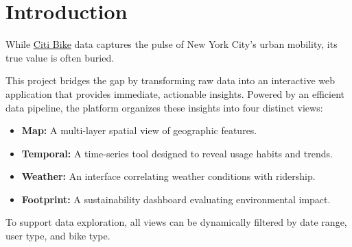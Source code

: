 \section{Introduction}\label{sec:introduction}
While \href{https://www.citibikenyc.com/system-data}{\underline{Citi Bike}} data captures the pulse of New York City's urban mobility, its true value is often buried.

This project bridges the gap by transforming raw data into an interactive web application that provides immediate, actionable insights.
Powered by an efficient data pipeline, the platform organizes these insights into four distinct views:
\begin{itemize}
    \item \textbf{Map:} A multi-layer spatial view of geographic features.
    \item \textbf{Temporal:} A time-series tool designed to reveal usage habits and trends.
    \item \textbf{Weather:} An interface correlating weather conditions with ridership.
    \item \textbf{Footprint:} A sustainability dashboard evaluating environmental impact.
\end{itemize}
To support data exploration, all views can be dynamically filtered by date range, user type, and bike type.